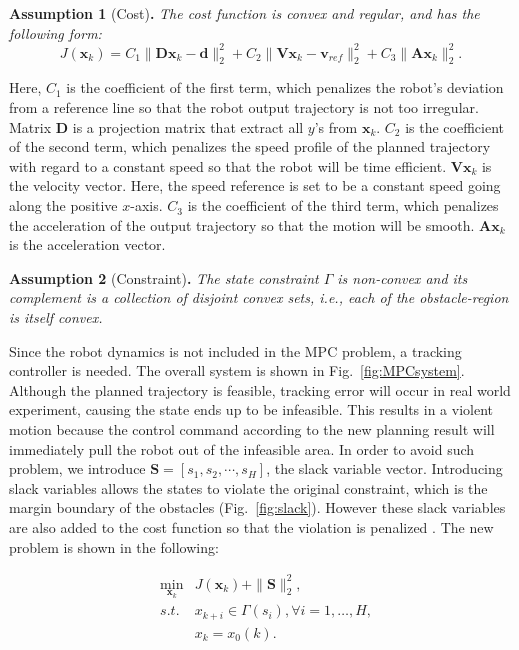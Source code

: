 \documentclass[letterpaper, 10 pt, conference]{ieeeconf}  %
\begin{document}
\textbf{Assumption 1} (Cost)\textbf{.}
\emph{
The cost function is convex and regular, and has the following form:
\begin{equation}
J(\mathbf{x}_k) = C_1\|\mathbf{D}\mathbf{x}_k-\mathbf{d}\|_{2}^2 + C_2 \|\mathbf{V}\mathbf{x}_k-\mathbf{v}_{ref}\|_2^2 +C_3\|\mathbf{A}\mathbf{x}_{k}\|_2^2.  
\end{equation} }

Here, $C_1$ is the coefficient of the first term, which penalizes the robot's deviation from a reference line so that the robot output trajectory is not too irregular. Matrix $\mathbf{D}$ is a projection matrix that extract all $y$'s from $\mathbf{x}_k$. $C_2$ is the coefficient of the second term, which penalizes the speed profile of the planned trajectory with regard to a constant speed so that the robot will be time efficient. $\mathbf{V}\mathbf{x}_k$ is the velocity vector. Here, the speed reference is set to be a constant speed going along the positive $x$-axis. $C_3$ is the coefficient of the third term, which penalizes the acceleration of the output trajectory so that the motion will be smooth. $\mathbf{A}\mathbf{x}_{k}$ is the acceleration vector.

\textbf{Assumption 2} (Constraint)\textbf{.}
\emph{
The state constraint $\Gamma$ is non-convex and its complement is a collection of disjoint convex sets, i.e., each of the obstacle-region is itself convex. }

Since the robot dynamics is not included in the MPC problem, a tracking controller is needed. The overall system is shown in Fig.~\ref{fig:MPCsystem}. Although the planned trajectory  is feasible, tracking error will occur in real world experiment, causing the state ends up to be infeasible. This results in a violent motion because the control command according to the new planning result will immediately pull the robot out of the infeasible area. In order to avoid such problem, we introduce  $\mathbf{S}=[s_1, s_2,\cdots,s_H]$, the slack variable vector. Introducing slack variables allows the states to violate the original constraint, which is the margin boundary of the obstacles (Fig.~\ref{fig:slack}). However these slack variables are also added to the cost function so that the violation is penalized \cite{chen2018foad}. The new problem is shown in the following:

\begin{eqnarray}
&\min_{\mathbf{x}_{k}} & J(\mathbf{x}_k) + \|\mathbf{S}\|_{2}^2 ,\\
&s.t.& x_{k+i} \in\Gamma(s_{i}),\forall i=1,\ldots,H,\\
&&         x_{k}=x_0(k).
\end{eqnarray} 
\end{document}
